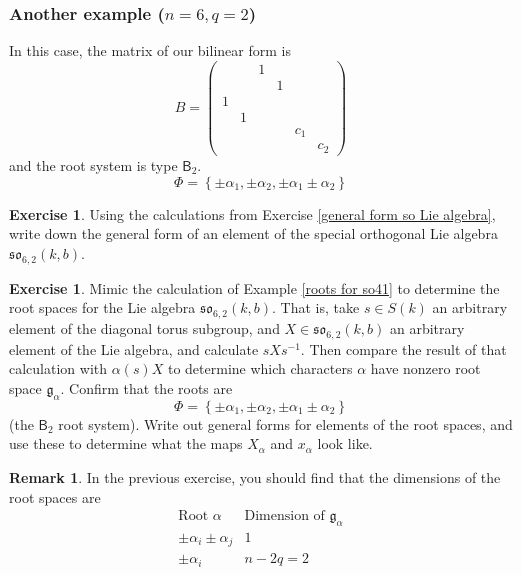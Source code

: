 \documentclass[12pt]{article}
\theoremstyle{definition}
\newtheorem{remark}[theorem]{Remark}
\newtheorem{exercise}[theorem]{Exercise}
\newcommand{\lb}{\left\{}
\newcommand{\rb}{\right\}}
\newcommand{\inv}{^{-1}}
\newcommand{\frakg}{\mathfrak{g}}
\newcommand{\frakso}{\mathfrak{so}}
\begin{document}
\subsubsection{Another example ($n=6,q=2$)}

In this case, the matrix of our bilinear form is
\[
	B =
	\begin{pmatrix}
		&& 1 \\
		&&& 1 \\
		1 \\
		& 1 \\
		&&&& c_1 \\
		&&&&& c_2
	\end{pmatrix}
\]
and the root system is type $\mathsf{B}_2$.
\[
	\Phi = \lb \pm \alpha_1, \pm \alpha_2, \pm \alpha_1 \pm \alpha_2 \rb
\]

\begin{exercise}
\label{62 so Lie algebra}
Using the calculations from Exercise \ref{general form so Lie algebra}, write down the general form of an element of the special orthogonal Lie algebra $\frakso_{6,2}(k,b)$.
\end{exercise}

\begin{exercise}
\label{62 so root spaces}
Mimic the calculation of Example \ref{roots for so41} to determine the root spaces for the Lie algebra $\frakso_{6,2}(k,b)$. That is, take $s \in S(k)$ an arbitrary element of the diagonal torus subgroup, and $X \in \frakso_{6,2}(k,b)$ an arbitrary element of the Lie algebra, and calculate $sXs \inv$. Then compare the result of that calculation with $\alpha(s) X$ to determine which characters $\alpha$ have nonzero root space $\frakg_\alpha$. Confirm that the roots are
\[
	\Phi = \lb \pm \alpha_1, \pm \alpha_2, \pm \alpha_1 \pm \alpha_2 \rb
\]
(the $\mathsf{B}_2$ root system). Write out general forms for elements of the root spaces, and use these to determine what the maps $X_\alpha$ and $x_\alpha$ look like.
\end{exercise}

\begin{remark}
In the previous exercise, you should find that the dimensions of the root spaces are
\[
	\begin{array}{c|c}
		\text{Root } \alpha & \text{Dimension of } \frakg_\alpha \\
		\hline
		\pm \alpha_i \pm \alpha_j & 1 \\
		\pm \alpha_i & n-2q = 2
	\end{array}
\]
\end{remark}
\end{document}
